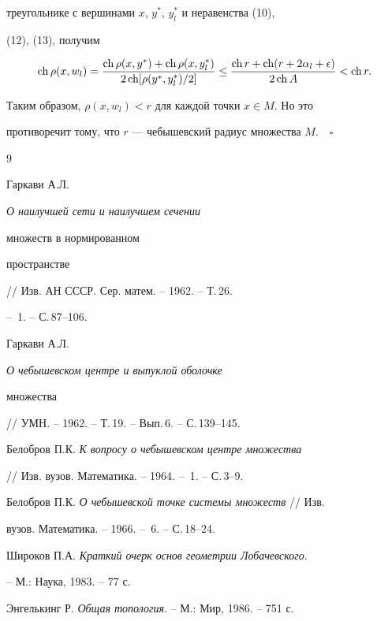 треугольнике с вершинами $x$, $y^{*}$, $y^{*}_{l}$ и неравенства (10),


(12), (13), получим


$$


\ch\rho(x,w_{l}) = \frac{\ch\rho(x,y^{*}) +


\ch\rho(x,y^{*}_{l})}{2\ch[\rho(y^{*},y^{*}_{l})/2]} \leq 


\frac{\ch r + \ch(r + 2\alpha_{l} + \epsilon)}{2\ch A} < \ch r.


$$


Таким образом, $\rho(x,w_{l}) < r$ для каждой точки $x \in M$. Но это


противоречит тому, что $r$ --- чебышевский радиус множества $M.\quad\square$





\begin{thebibliography}{9} 





 Гаркави А.Л. {\em О наилучшей сети и наилучшем сечении


множеств в нормированном


пространстве} // Изв. АН СССР. Сер. матем. -- 1962. -- Т.\,26.


-- \No\,1. -- С.\,87--106.


 Гаркави А.Л. {\em О чебышевском центре и выпуклой оболочке


множества} // УМН. -- 1962. -- Т.\,19. -- Вып.\,6. -- С.\,139--145.


 Белобров П.К. {\em К вопросу о чебышевском центре множества}


// Изв. вузов. Математика. -- 1964. -- \No\,1. -- С.\,3--9.


 Белобров П.К. {\em О чебышевской точке системы множеств} // Изв.


вузов. Математика. -- 1966. -- \No\,6. -- С.\,18--24.


 Широков П.А. {\em Краткий очерк основ геометрии Лобачевского}.


-- М.: Наука, 1983. -- 77 с.


 Энгелькинг Р. {\em Общая топология}. -- М.: Мир, 1986. -- 751 с.





\end{thebibliography}





\vskip 2cm












\label{end}





